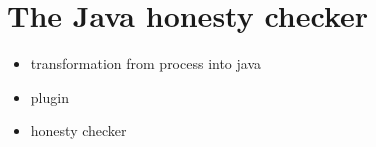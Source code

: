 
\section{The Java honesty checker}\label{sec:java-honesty}

\begin{itemize}
\item transformation from \coco process into java 
\item \coco plugin
\item honesty checker
\end{itemize}
